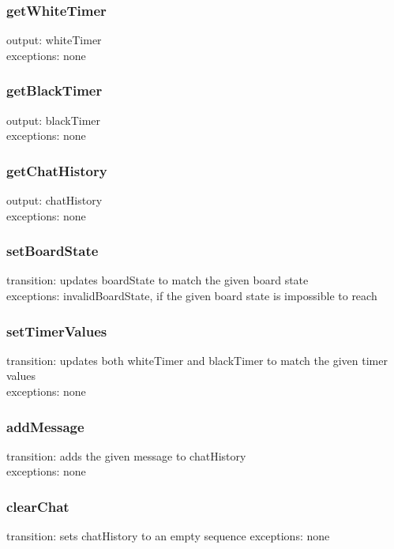 \documentclass[12pt, titlepage]{article}
\begin{document}
        \subsubsection*{getWhiteTimer} 
            output: whiteTimer \\
            exceptions: none
        
        \subsubsection*{getBlackTimer} 
            output: blackTimer \\
            exceptions: none
        
        \subsubsection*{getChatHistory} 
            output: chatHistory \\
            exceptions: none
        
        \subsubsection*{setBoardState} 
            transition: updates boardState to match the given board state \\
            exceptions: invalidBoardState, if the given board state is impossible to reach
        
        \subsubsection*{setTimerValues} 
            transition: updates both whiteTimer and blackTimer to match the given timer values \\
            exceptions: none
        
        \subsubsection*{addMessage} 
            transition: adds the given message to chatHistory \\
            exceptions: none
        
        \subsubsection*{clearChat} 
            transition: sets chatHistory to an empty sequence
            exceptions: none
\end{document}
